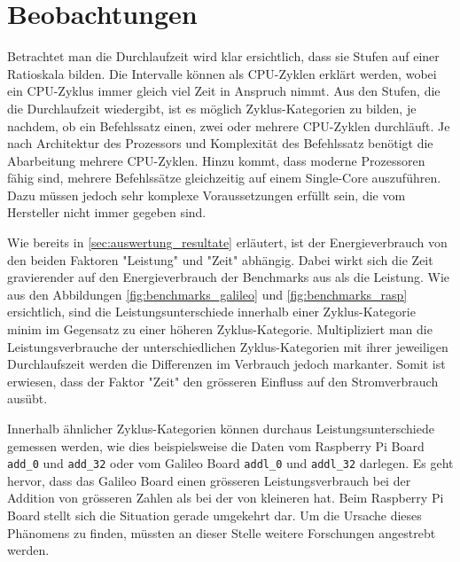 





\section{Beobachtungen}

Betrachtet man die Durchlaufzeit wird klar ersichtlich, dass sie Stufen auf einer Ratioskala bilden. Die Intervalle können als CPU-Zyklen erklärt werden, wobei ein CPU-Zyklus immer gleich viel Zeit in Anspruch nimmt. Aus den Stufen, die die Durchlaufzeit wiedergibt, ist es möglich Zyklus-Kategorien zu bilden, je nachdem, ob ein Befehlssatz einen, zwei oder mehrere CPU-Zyklen durchläuft. Je nach Architektur des Prozessors und Komplexität des Befehlssatz benötigt die Abarbeitung mehrere CPU-Zyklen. Hinzu kommt, dass moderne Prozessoren fähig sind, mehrere Befehlssätze gleichzeitig auf einem Single-Core auszuführen. Dazu müssen jedoch sehr komplexe Voraussetzungen erfüllt sein, die vom Hersteller nicht immer gegeben sind.
\par
Wie bereits in \autoref{sec:auswertung_resultate} erläutert, ist der Energieverbrauch von den beiden Faktoren "Leistung" und "Zeit" abhängig. Dabei wirkt sich die Zeit gravierender auf den Energieverbrauch der Benchmarks aus als die Leistung. Wie aus den Abbildungen \autoref{fig:benchmarks_galileo} und \ref{fig:benchmarks_rasp} ersichtlich, sind die Leistungsunterschiede innerhalb einer Zyklus-Kategorie minim im Gegensatz zu einer höheren Zyklus-Kategorie. Multipliziert man die Leistungsverbrauche der unterschiedlichen Zyklus-Kategorien mit ihrer jeweiligen Durchlaufszeit werden die Differenzen im Verbrauch jedoch markanter. Somit ist erwiesen, dass der Faktor "Zeit" den grösseren Einfluss auf den Stromverbrauch ausübt. 
\par
Innerhalb ähnlicher Zyklus-Kategorien können durchaus Leistungsunterschiede gemessen werden, wie dies beispielsweise die Daten vom Raspberry Pi Board \texttt{add\_0} und \texttt{add\_32} oder vom Galileo Board \texttt{addl\_0} und \texttt{addl\_32} darlegen. Es geht hervor, dass das Galileo Board einen grösseren Leistungsverbrauch bei der Addition von grösseren Zahlen als bei der von kleineren hat. Beim Raspberry Pi Board stellt sich die Situation gerade umgekehrt dar. Um die Ursache dieses Phänomens zu finden, müssten an dieser Stelle weitere Forschungen angestrebt werden.
\par
